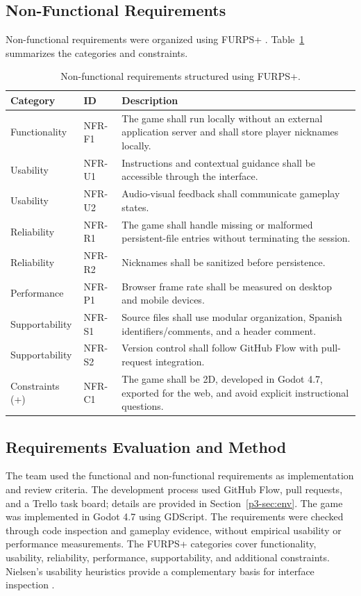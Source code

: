 \documentclass[conference]{IEEEtran}
\begin{document}
\subsection{Non-Functional Requirements}
Non-functional requirements were organized using FURPS+ \cite{grady1987}. Table~\ref{p1-tab:nfr} summarizes the categories and constraints.

\begin{table}[t]
\caption{Non-functional requirements structured using FURPS+.}
\label{p1-tab:nfr}
\centering
\small
\begin{tabularx}{\textwidth}{@{}p{2.45cm}lX@{}}
\toprule
\textbf{Category} & \textbf{ID} & \textbf{Description}\\
\midrule
Functionality & NFR-F1 & The game shall run locally without an external application server and shall store player nicknames locally.\\
Usability & NFR-U1 & Instructions and contextual guidance shall be accessible through the interface.\\
Usability & NFR-U2 & Audio-visual feedback shall communicate gameplay states.\\
Reliability & NFR-R1 & The game shall handle missing or malformed persistent-file entries without terminating the session.\\
Reliability & NFR-R2 & Nicknames shall be sanitized before persistence.\\
Performance & NFR-P1 & Browser frame rate shall be measured on desktop and mobile devices.\\
Supportability & NFR-S1 & Source files shall use modular organization, Spanish identifiers/comments, and a header comment.\\
Supportability & NFR-S2 & Version control shall follow GitHub Flow with pull-request integration.\\
Constraints (+) & NFR-C1 & The game shall be 2D, developed in Godot 4.7, exported for the web, and avoid explicit instructional questions.\\
\bottomrule
\end{tabularx}
\end{table}

\subsection{Requirements Evaluation and Method}
The team used the functional and non-functional requirements as implementation and review criteria. The development process used GitHub Flow, pull requests, and a Trello task board; details are provided in Section~\ref{p3-sec:env}. The game was implemented in Godot 4.7 using GDScript. The requirements were checked through code inspection and gameplay evidence, without empirical usability or performance measurements. The FURPS+ categories cover functionality, usability, reliability, performance, supportability, and additional constraints. Nielsen's usability heuristics provide a complementary basis for interface inspection \cite{nielsen1994}.
\end{document}
